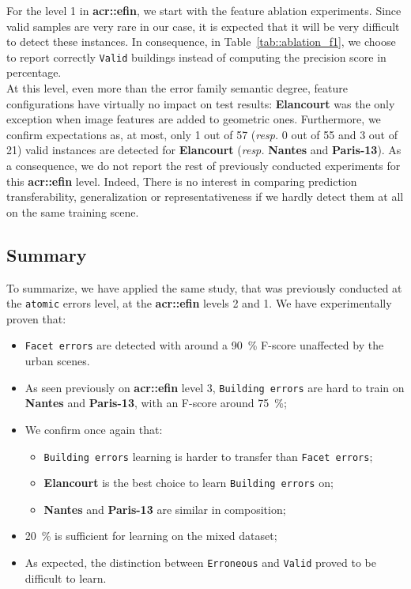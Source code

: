         For the level 1 in \textbf{\gls{acr::efin}}, we start with the feature ablation experiments.
        Since valid samples are very rare in our case, it is expected that it will be very difficult to detect these instances.
        In consequence, in Table~\ref{tab::ablation_f1}, we choose to report correctly \texttt{Valid} buildings instead of computing the precision score in percentage.\\
            
        At this level, even more than the error family semantic degree, feature configurations have virtually no impact on test results: \textbf{Elancourt} was the only exception when image features are added to geometric ones.
        Furthermore, we confirm expectations as, at most, only 1 out of 57 (\textit{resp.} 0 out of 55 and 3 out of 21) valid instances are detected for \textbf{Elancourt} (\textit{resp.} \textbf{Nantes} and \textbf{Paris-13}).
        As a consequence, we do not report the rest of previously conducted experiments for this \textbf{\gls{acr::efin}} level.
        Indeed, There is no interest in comparing prediction transferability, generalization or representativeness if we hardly detect them at all on the same training scene.

    \subsection{Summary}
        \label{subsec::more_experiments::finesse::summary}
        To summarize, we have applied the same study, that was previously conducted at the \texttt{atomic} errors level, at the \textbf{\gls{acr::efin}} levels 2 and 1.
        We have experimentally proven that:
        \begin{itemize}[label=\(\blacktriangleright\)]
            \item \texttt{Facet errors} are detected with around a \SI{90}{\percent} F-score unaffected by the urban scenes.
            \item As seen previously on \textbf{\gls{acr::efin}} level 3, \texttt{Building errors} are hard to train on \textbf{Nantes} and \textbf{Paris-13}, with an F-score around \SI{75}{\percent};
            \item We confirm once again that:
            \begin{itemize}[label=\(\blacktriangleright\)]
                \item \texttt{Building errors} learning is harder to transfer than \texttt{Facet errors};
                \item \textbf{Elancourt} is the best choice to learn \texttt{Building errors} on;
                \item \textbf{Nantes} and \textbf{Paris-13} are similar in composition;
            \end{itemize}
            \item \SI{20}{\percent} is sufficient for learning on the mixed dataset;
            \item As expected, the distinction between \texttt{Erroneous} and \texttt{Valid} proved to be difficult to learn.
        \end{itemize}


